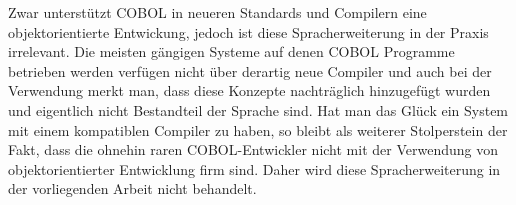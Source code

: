 Zwar unterstützt COBOL in neueren Standards und Compilern eine objektorientierte Entwickung, jedoch ist diese Spracherweiterung in der Praxis irrelevant. Die meisten gängigen Systeme auf denen COBOL Programme betrieben werden verfügen nicht über derartig neue Compiler und auch bei der Verwendung merkt man, dass diese Konzepte nachträglich hinzugefügt wurden und eigentlich nicht Bestandteil der Sprache sind. Hat man das Glück ein System mit einem kompatiblen Compiler zu haben, so bleibt als weiterer Stolperstein der Fakt, dass die ohnehin raren COBOL-Entwickler nicht mit der Verwendung von objektorientierter Entwicklung firm sind. Daher wird diese Spracherweiterung in der vorliegenden Arbeit nicht behandelt. 